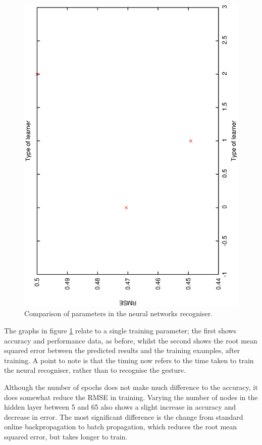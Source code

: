 \documentclass[12pt,a4,notitlepage]{report}
\renewcommand{\_}{\texttt{\symbol{95}}}
\newcommand{\<}{\texttt{\symbol{60}}}
\renewcommand{\>}{\texttt{\symbol{62}}}
\begin{document}
\begin{figure}
\includegraphics[scale=0.3,angle=-90]{results/neural_err/n_learner.ps}
\caption{Comparison of parameters in the neural networks recogniser.}
\label{n_intparameters}
\end{figure}

The graphs in figure \ref{n_intparameters} relate to a single training parameter; the first shows accuracy and performance data, as before, whilst the second shows the root mean squared error between the predicted results and the training examples, after training. A point to note is that the timing now refers to the time taken to train the neural recogniser, rather than to recognise the gesture.

Although the number of epochs does not make much difference to the accuracy, it does somewhat reduce the RMSE in training. Varying the number of nodes in the hidden layer between 5 and 65 also shows a slight increase in accuracy and decrease in error. The most significant difference is the change from standard online backpropagation to batch propagation, which reduces the root mean squared error, but takes longer to train.
\end{document}
